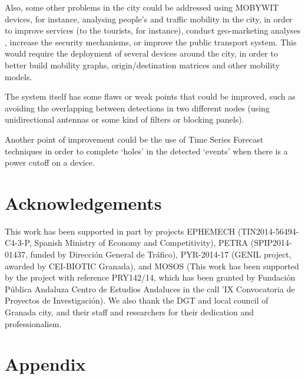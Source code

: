 \documentclass[preprint]{elsarticle}
\begin{document}
Also, some other problems in the city could be addressed using MOBYWIT devices, for instance, analysing people's and traffic mobility in the city, in order to improve services (to the tourists, for instance), conduct geo-marketing analyses \cite{Flyers-GeoMarketing,LaMarca-GeoMarketing}, increase the security mechanisms, or improve the public transport system.
This would require the deployment of several devices around the city, in order to better build mobility graphs, origin/destination matrices and other mobility models.

The system itself has some flaws or weak points that could be improved, such as avoiding the overlapping between detections in two different nodes (using unidirectional antennas or some kind of filters or blocking panels).

Another point of improvement could be the use of Time Series Forecast techniques in order to complete `holes' in the detected `events' when there is a power cutoff on a device.


\section*{Acknowledgements}

This work has been supported in part by projects EPHEMECH (TIN2014-56494-C4-3-P, Spanish Ministry of Economy and Competitivity), PETRA (SPIP2014-01437, funded by Dirección General de Tráfico), PYR-2014-17 (GENIL project, awarded by CEI-BIOTIC Granada), and MOSOS (This work has been supported by the project with reference PRY142/14, which has been granted by Fundación Pública Andaluza Centro de Estudios Andaluces in the call 'IX Convocatoria de Proyectos de Investigación). We also thank the DGT and local council of Granada city, and their staff and researchers for their dedication and professionalism. 









\section{Appendix} 
\end{document}
